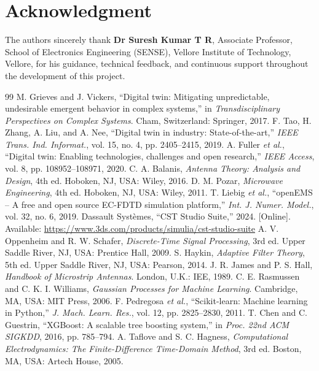 \documentclass[12pt,a4paper]{article}
\begin{document}
\section*{Acknowledgment}
The authors sincerely thank \textbf{Dr Suresh Kumar T R}, Associate Professor, School of Electronics Engineering (SENSE), Vellore Institute of Technology, Vellore, for his guidance, technical feedback, and continuous support throughout the development of this project.

\begin{thebibliography}{99}
 M. Grieves and J. Vickers, ``Digital twin: Mitigating unpredictable, undesirable emergent behavior in complex systems,'' in \textit{Transdisciplinary Perspectives on Complex Systems}. Cham, Switzerland: Springer, 2017.
 F. Tao, H. Zhang, A. Liu, and A. Nee, ``Digital twin in industry: State-of-the-art,'' \textit{IEEE Trans. Ind. Informat.}, vol. 15, no. 4, pp. 2405--2415, 2019.
 A. Fuller \textit{et al.}, ``Digital twin: Enabling technologies, challenges and open research,'' \textit{IEEE Access}, vol. 8, pp. 108952--108971, 2020.
 C. A. Balanis, \textit{Antenna Theory: Analysis and Design}, 4th ed. Hoboken, NJ, USA: Wiley, 2016.
 D. M. Pozar, \textit{Microwave Engineering}, 4th ed. Hoboken, NJ, USA: Wiley, 2011.
 T. Liebig \textit{et al.}, ``openEMS -- A free and open source EC-FDTD simulation platform,'' \textit{Int. J. Numer. Model.}, vol. 32, no. 6, 2019.
 Dassault Syst\`emes, ``CST Studio Suite,'' 2024. [Online]. Available: \url{https://www.3ds.com/products/simulia/cst-studio-suite}
 A. V. Oppenheim and R. W. Schafer, \textit{Discrete-Time Signal Processing}, 3rd ed. Upper Saddle River, NJ, USA: Prentice Hall, 2009.
 S. Haykin, \textit{Adaptive Filter Theory}, 5th ed. Upper Saddle River, NJ, USA: Pearson, 2014.
 J. R. James and P. S. Hall, \textit{Handbook of Microstrip Antennas}. London, U.K.: IEE, 1989.
 C. E. Rasmussen and C. K. I. Williams, \textit{Gaussian Processes for Machine Learning}. Cambridge, MA, USA: MIT Press, 2006.
 F. Pedregosa \textit{et al.}, ``Scikit-learn: Machine learning in Python,'' \textit{J. Mach. Learn. Res.}, vol. 12, pp. 2825--2830, 2011.
 T. Chen and C. Guestrin, ``XGBoost: A scalable tree boosting system,'' in \textit{Proc. 22nd ACM SIGKDD}, 2016, pp. 785--794.
 A. Taflove and S. C. Hagness, \textit{Computational Electrodynamics: The Finite-Difference Time-Domain Method}, 3rd ed. Boston, MA, USA: Artech House, 2005.

\end{thebibliography}
\end{document}
